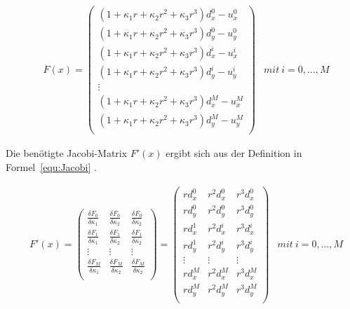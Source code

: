 \begin{equation}
\label{equ:Problem}
\begin{aligned}
&F(x)=
\begin{pmatrix}
(1+\kappa_1 r + \kappa_2 r^2 + \kappa_3 r^3)d_x^0 -u_x^0\\
(1+\kappa_1 r + \kappa_2 r^2 + \kappa_3 r^3)d_y^0 -u_y^0\\
(1+\kappa_1 r + \kappa_2 r^2 + \kappa_3 r^3)d_x^i -u_x^i\\
(1+\kappa_1 r + \kappa_2 r^2 + \kappa_3 r^3)d_y^i -u_y^i\\
\vdots\\
(1+\kappa_1 r + \kappa_2 r^2 + \kappa_3 r^3)d_x^M -u_x^M\\
(1+\kappa_1 r + \kappa_2 r^2 + \kappa_3 r^3)d_y^M -u_y^M\\
\end{pmatrix}
&mit\ i = 0,\dots,M
\end{aligned}
\end{equation}

Die benötigte Jacobi-Matrix $F'(x)$ ergibt sich aus der Definition in Formel~\ref{equ:Jacobi} .

\begin{equation}
\label{equ:Jacobi}
\begin{aligned}
&F'(x)=
\begin{pmatrix}
\frac{\delta F_0}{\delta \kappa_1} & \frac{\delta F_0}{\delta \kappa_2} & \frac{\delta F_0}{\delta \kappa_2}\\
\frac{\delta F_1}{\delta \kappa_1} & \frac{\delta F_1}{\delta \kappa_2} & \frac{\delta F_1}{\delta \kappa_2}\\
 \vdots & \vdots & \vdots \\
\frac{\delta F_M}{\delta \kappa_1} & \frac{\delta F_M}{\delta \kappa_2} & \frac{\delta F_M}{\delta \kappa_2}\\
\end{pmatrix}= \begin{pmatrix}
rd_x^0 & r^2d_x^0 & r^3d_x^0\\
rd_y^0 & r^2d_y^0 & r^3d_y^0\\
rd_x^1 & r^2d_x^i & r^3d_x^i\\
rd_y^1 & r^2d_y^i & r^3d_y^i\\
\vdots & \vdots & \vdots \\
rd_x^M & r^2d_x^M & r^3d_x^M\\
rd_y^M & r^2d_y^M & r^3d_y^M\\
\end{pmatrix}
&mit\ i = 0,\dots,M
\end{aligned}
\end{equation}

